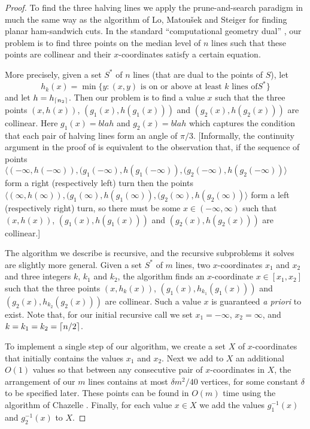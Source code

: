 \documentclass[lotsofwhite]{patmorin}
\begin{document}
\begin{proof}

To find the three halving lines we apply the prune-and-search paradigm
in much the same way as the algorithm of Lo, Matou\v{s}ek and Steiger
\cite{lms94} for finding planar ham-sandwich cuts.  In the standard
``computational geometry dual'' \cite[Chapter~X]{dbeXX}, our problem
is to find three points on the median level of $n$ lines such that
these points are collinear and their $x$-coordinates satisfy a certain
equation.  

More precisely, given a set $S^*$ of $n$ lines (that are dual to the
points of $S$), let
\[
    h_k(x) = \min\{ y : 
        \mbox{$(x,y)$ is on or above at least $k$ lines of
$S^*$}\} 
\]
and let $h=h_{\left\lceil n_2 \right\rceil}$.
Then our problem is to find a value $x$ such that the three points
$(x,h(x))$, $(g_1(x),h(g_1(x)))$ and $(g_2(x),h(g_2(x)))$ are collinear.
Here $g_1(x)=blah$ and
$g_2(x)=blah$ which captures the condition that each pair of halving
lines form an angle of $\pi/3$.  [Informally, the continuity argument in
the proof of  is equivalent to the observation
that, if the sequence of points $\langle(-\infty,h(-\infty)),
(g_1(-\infty),h(g_1(-\infty)), (g_2(-\infty),h(g_2(-\infty))\rangle$ form
a right (respectively left) turn then the points $\langle(\infty,h(\infty)),
(g_1(\infty),h(g_1(\infty)), (g_2(\infty),h(g_2(\infty))\rangle$ form a
left (respectively right) turn, so there must be some
$x\in(-\infty,\infty)$ such that 
$(x,h(x))$, $(g_1(x),h(g_1(x)))$ and $(g_2(x),h(g_2(x)))$ are
collinear.]

The algorithm we describe is recursive, and the recursive subproblems
it solves are slightly more general.  Given a set $S^*$ of $m$ lines,
two $x$-coordinates $x_1$ and $x_2$ and three integers $k$, $k_1$ and
$k_2$, the algorithm finds an $x$-coordinate $x\in[x_1,x_2]$ such that
the three points $(x,h_k(x))$, $(g_1(x),h_{k_1}(g_1(x)))$ and
$(g_2(x),h_{k_2}(g_2(x)))$ are collinear.  Such a value $x$ is
guaranteed \emph{a priori} to exist.  Note that, for our initial
recursive call we set $x_1=-\infty$, $x_2=\infty$, and
$k=k_1=k_2=\left\lceil n/2 \right\rceil$.
 
To implement a single step of our algorithm, we create a set $X$ of
$x$-coordinates that initially contains the values $x_1$ and $x_2$.
Next we add to $X$ an additional $O(1)$ values so that between any
consecutive pair of $x$-coordinates in $X$, the arrangement of our $m$
lines contains at most $\delta m^2/40$ vertices, for some constant
$\delta$ to be specified later.  These points can be found in $O(m)$
time using the algorithm of Chazelle \cite{X}.  Finally, for each
value $x\in X$ we add the values $g_1^{-1}(x)$ and $g_2^{-1}(x)$ to
$X$.  


\end{proof}
\end{document}
